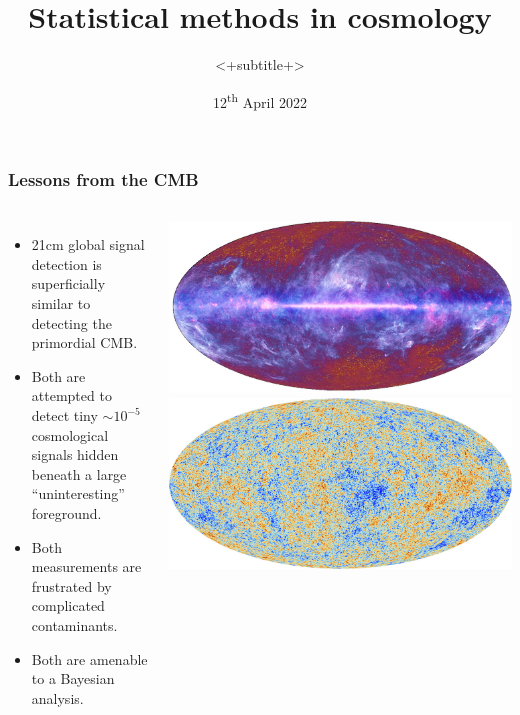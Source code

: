 \documentclass[aspectratio=169]{beamer}
\title{Statistical methods in cosmology}
\subtitle{<+subtitle+>}
\date{12\textsuperscript{th} April 2022}
\begin{document}
\begin{frame}
    \titlepage
\end{frame}

\begin{frame}
    \frametitle{Lessons from the CMB}
    \begin{columns}
        \begin{itemize}
            \item 21cm global signal detection is superficially similar to detecting the primordial CMB.
            \item Both are attempted to detect tiny $\sim 10^{-5}$ cosmological signals hidden beneath a large ``uninteresting'' foreground.
            \item Both measurements are frustrated by complicated contaminants.
            \item Both are amenable to a Bayesian analysis.
        \end{itemize}
        \includegraphics[width=\textwidth]{figures/9HXKAsNw5LtSRHFPWfeqiB.jpg}
        \includegraphics[width=\textwidth]{figures/Planck_satellite_cmb.jpg}

    \end{columns}
\end{frame}
\end{document}
